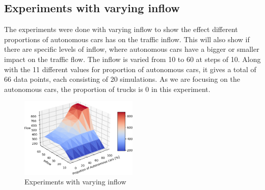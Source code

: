 \subsection{Experiments with varying inflow}
The experiments were done with varying inflow to show the effect different proportions of autonomous cars has on the traffic inflow. This will also show if there are specific levels of inflow, where autonomous cars have a bigger or smaller impact on the traffic flow. The inflow is varied from 10 to 60 at steps of 10. Along with the 11 different values for proportion of autonomous cars, it gives a total of 66 data points, each consisting of 20 simulations.
As we are focusing on the autonomous cars, the proportion of trucks is 0 in this experiment.

\begin{figure}[H]
    \centering
    \includegraphics[width=0.5\textwidth]{images/Experiment1.png}
    \caption{Experiments with varying inflow}
    \label{fig:experiment1}
\end{figure}

